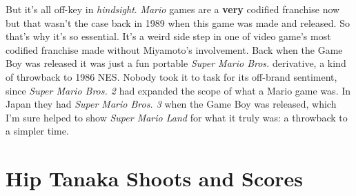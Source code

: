 \documentclass{book}
\let\oldcenter\center
\let\oldendcenter\endcenter
\renewenvironment{center}{\setlength\topsep{0pt}\oldcenter}{\oldendcenter}
\begin{document}
\begin{center}
\quad\vspace{4pt}
\quad\vspace{4pt}
\quad\vspace{4pt}
\quad\vspace{4pt}
\quad\vspace{4pt}
\quad\vspace{4pt}
\quad\vspace{4pt}
\quad\vspace{4pt}
\quad\vspace{4pt}
\end{center}

But it’s all off-key in \emph{hindsight}. \emph{Mario} games are a \textbf{very} codified franchise now but that wasn’t the case back in 1989 when this game was made and released. So that’s why it’s so essential. It’s a weird side step in one of video game’s most codified franchise made without Miyamoto’s involvement. Back when the Game Boy was released it was just a fun portable \emph{Super Mario Bros.} derivative, a kind of throwback to 1986 NES. Nobody took it to task for its off-brand sentiment, since \emph{Super Mario Bros. 2} had expanded the scope of what a Mario game was. In Japan they had \emph{Super Mario Bros. 3} when the Game Boy was released, which I’m sure helped to show \emph{Super Mario Land} for what it truly was: a throwback to a simpler time.

\FloatBarrier\needspace{10mm}\section*{Hip Tanaka Shoots and Scores}\nopagebreak[4]
\end{document}

